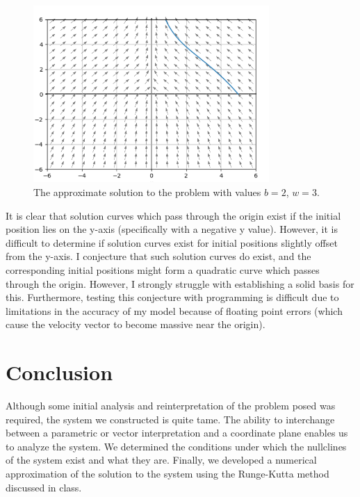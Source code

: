 \documentclass{article}
\begin{document}
    \begin{figure}[H]
        \centering
        \includegraphics[width=0.8\textwidth]{media/overlay2.png}
        \caption{\label{fig:overlay-2} The approximate solution to the problem
        with values $b = 2$, $w = 3$.}
    \end{figure}
    It is clear that solution curves which pass through the origin exist if the
    initial position lies on the y-axis (specifically with a negative y value).
    However, it is difficult to determine if solution curves exist for initial
    positions slightly offset from the y-axis. I conjecture that such solution
    curves do exist, and the corresponding initial positions might form a quadratic
    curve which passes through the origin. However, I strongly struggle with
    establishing a solid basis for this. Furthermore, testing this conjecture
    with programming is difficult due to limitations in the accuracy of my model
    because of floating point errors (which cause the velocity vector to become
    massive near the origin).

    \section{Conclusion}
    Although some initial analysis and reinterpretation of the problem posed was
    required, the system we constructed is quite tame. The ability to
    interchange between a parametric or vector interpretation and a coordinate
    plane enables us to analyze the system. We determined the conditions under
    which the nullclines of the system exist and what they are. Finally, we
    developed a numerical approximation of the solution to the system using the
    Runge-Kutta method discussed in class.
\end{document}

